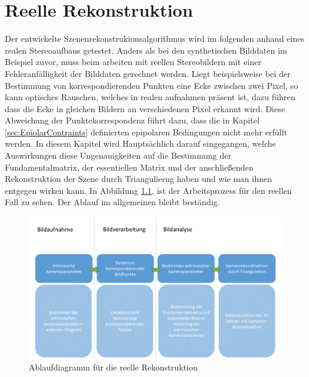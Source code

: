 \chapter{Reelle Rekonstruktion}
\label{sec:real} 

Der entwickelte Szenenrekonstrukionsalgorithmus wird im folgenden anhand eines realen Stereoaufbaus getestet. Anders als bei den synthetischen Bilddaten im Beispiel zuvor, muss beim arbeiten mit reellen Stereobildern mit einer Fehleranfälligkeit der Bilddaten gerechnet werden. Liegt beispielsweise bei der Bestimmung von korrespondierenden Punkten eine Ecke zwischen zwei Pixel, so kann optisches Rauschen, welches in realen aufnahmen präsent ist, dazu führen dass die Ecke in gleichen Bildern an verschiedenen Pixel erkannt wird. Diese Abweichung der Punktekorrespondenz führt dazu, dass die in Kapitel \ref{sec:EpiolarContraints} definierten epipolaren Bedingungen nicht mehr erfüllt werden. In diesem Kapitel wird Hauptsächlich darauf eingegangen, welche Auswirkungen diese Ungenauigkeiten auf die Bestimmung der Fundamentalmatrix, der essentiellen Matrix und der anschließenden Rekonstruktion der Szene durch Triangulierng haben und wie man ihnen entgegen wirken kann. In Abbildung \ref{fig:ArbeitsProzessReell}, ist der Arbeitsprozess für den reellen Fall zu sehen. Der Ablauf im allgemeinen bleibt beständig.

%

\begin{figure}[!htb]
	\centering
	\includegraphics[width=1.\linewidth]{images/NEU_real_Arbeitsprozess.png}
	\caption[Ablaufdiagramm für die reelle Rekonstruktion]{Ablaufdiagramm für die reelle Rekonstruktion}
	\label{fig:ArbeitsProzessReell}
\end{figure}

